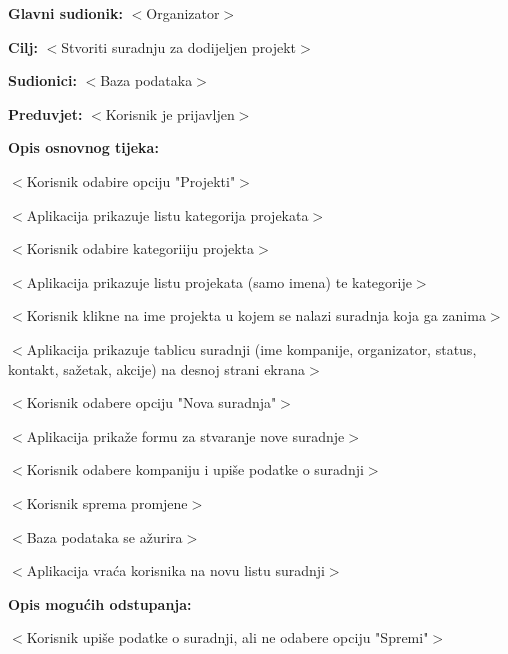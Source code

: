 					\begin{packed_item}

						\item \textbf{Glavni sudionik: }$<$Organizator$>$
						\item  \textbf{Cilj:} $<$Stvoriti suradnju za dodijeljen projekt$>$
						\item  \textbf{Sudionici:} $<$Baza podataka$>$
						\item  \textbf{Preduvjet:} $<$Korisnik je prijavljen$>$
						\item  \textbf{Opis osnovnog tijeka:}

						\item[] \begin{packed_enum}

							\item $<$Korisnik odabire opciju "Projekti"$>$
							\item $<$Aplikacija prikazuje listu kategorija projekata$>$
							\item $<$Korisnik odabire kategoriiju projekta$>$
							\item $<$Aplikacija prikazuje listu projekata (samo imena) te kategorije$>$
							\item $<$Korisnik klikne na ime projekta u kojem se nalazi suradnja koja ga zanima$>$
							\item $<$Aplikacija prikazuje tablicu suradnji (ime kompanije, organizator, status,
							kontakt, sažetak, akcije) na desnoj strani ekrana$>$
							\item $<$Korisnik odabere opciju "Nova suradnja"$>$
							\item $<$Aplikacija prikaže formu za stvaranje nove suradnje$>$
							\item $<$Korisnik odabere kompaniju i upiše podatke o suradnji$>$
							\item $<$Korisnik sprema promjene$>$
							\item $<$Baza podataka se ažurira$>$
							\item $<$Aplikacija vraća korisnika na novu listu suradnji$>$
						\end{packed_enum}

						\item  \textbf{Opis mogućih odstupanja:}

						\item[] \begin{packed_item}

							\item[8.a] $<$Korisnik upiše podatke o suradnji, ali ne odabere opciju "Spremi"$>$
							\item[] \begin{packed_enum}


\end{packed_enum}
\end{packed_item}
\end{packed_item}
